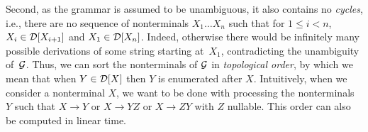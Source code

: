 Second, as the grammar is assumed to be unambiguous, it also contains
no \emph{cycles}, %
i.e., there are no sequence of nonterminals
$X_1 \dots X_n$ such that for $1\leq i < n$, $X_i\in \mathcal{D}[X_{i+1}]$ and
$X_1\in \mathcal{D}[X_n]$. Indeed, otherwise 
%
there would be infinitely many possible derivations of some string
starting at~$X_1$, contradicting the unambiguity of~$\mathcal{G}$.  Thus, we can sort the nonterminals of $\mathcal{G}$
in \emph{topological order}, by which we mean that when $Y\in \mathcal{D}[X]$
then $Y$ is enumerated after $X$. Intuitively, when we consider a nonterminal
$X$, we want to be done with processing the nonterminals $Y$ such that $X \rightarrow
Y$ or $X \rightarrow YZ$ or $X \rightarrow ZY$ with $Z$ nullable. This order can also be computed in linear time.
%

